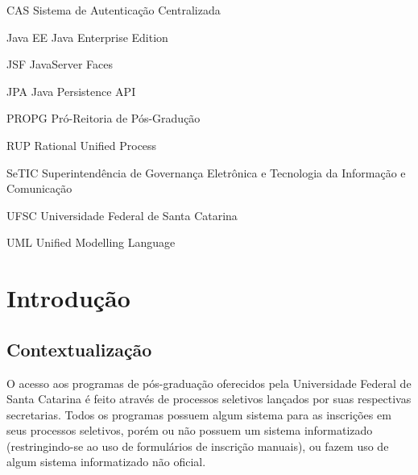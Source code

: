 \documentclass[
  10.5pt,				  %
	openright,			%
	twoside,			  %
  a5paper,
  chapter=TITLE,	%
	section=TITLE,	%
  hyphens,        %
	english,        %
	brazil          %
]{abntex2}
\begin{document}
\listoffigures*
\cleardoublepage

\listoftables*
\cleardoublepage

\begin{siglas}
  \item[CAS]     Sistema de Autenticação Centralizada
  \item[Java EE] Java Enterprise Edition
  \item[JSF]     JavaServer Faces
  \item[JPA]     Java Persistence API
  \item[PROPG]   Pró-Reitoria de Pós-Gradução
  \item[RUP]     Rational Unified Process
  \item[SeTIC]   Superintendência de Governança Eletrônica e Tecnologia da Informação e Comunicação
  \item[UFSC]    Universidade Federal de Santa Catarina
  \item[UML]     Unified Modelling Language
\end{siglas}



\tableofcontents*
\cleardoublepage



\textual%


\setcounter{page}{5}

\chapter{Introdução}

\section{Contextualização}

O acesso aos programas de pós-graduação oferecidos pela Universidade Federal de Santa Catarina é feito através de processos seletivos lançados por suas respectivas secretarias. Todos os programas possuem algum sistema para as inscrições em seus processos seletivos, porém ou não possuem um sistema informatizado (restringindo-se ao uso de formulários de inscrição manuais), ou fazem uso de algum sistema informatizado não oficial. 
\end{document}

